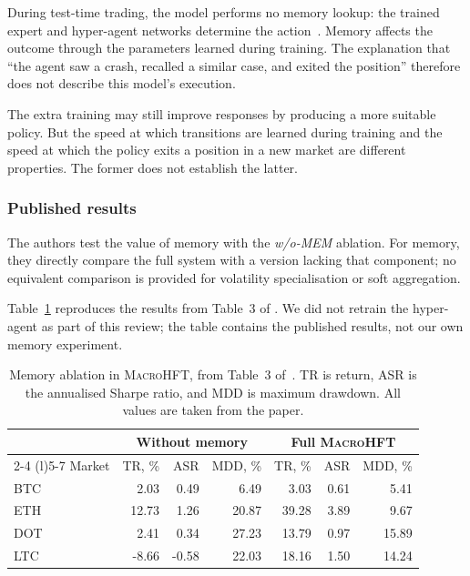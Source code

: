 \documentclass[9pt,a4paper,twocolumn]{extarticle}
\newcommand{\Macro}{\textsc{MacroHFT}}
\begin{document}
During test-time trading, the model performs no memory lookup: the trained expert and hyper-agent
networks determine the action~\cite{macrohftcode}. Memory affects the outcome through the
parameters learned during training. The explanation that ``the agent saw a crash, recalled a
similar case, and exited the position'' therefore does not describe this model's execution.

The extra training may still improve responses by producing a more suitable policy. But the
speed at which transitions are learned during training and the speed at which the policy exits a
position in a new market are different properties. The former does not establish the latter.

\subsubsection{Published results}

The authors test the value of memory with the \emph{w/o-MEM} ablation. For memory, they directly
compare the full system with a version lacking that component; no equivalent comparison is
provided for volatility specialisation or soft aggregation.

Table~\ref{tab:memory_ablation} reproduces the results from Table~3 of
\cite{zong2024macrohft}. We did not retrain the hyper-agent as part of this review; the table
contains the published results, not our own memory experiment.

\begin{table}[t]
  \centering
  \caption{Memory ablation in \Macro{}, from Table~3 of~\cite{zong2024macrohft}.
  TR is return, ASR is the annualised Sharpe ratio, and MDD is maximum drawdown.
  All values are taken from the paper.}
  \label{tab:memory_ablation}
  \footnotesize
  \renewcommand{\arraystretch}{1.15}
  \begin{tabular}{@{}lrrrrrr@{}}
    \toprule
    & \multicolumn{3}{c}{Without memory}
    & \multicolumn{3}{c}{Full \Macro{}}\\
    \cmidrule(lr){2-4}
    \cmidrule(l){5-7}
    Market
    & TR, \% & ASR & MDD, \%
    & TR, \% & ASR & MDD, \%\\
    \midrule
    BTC &  2.03 &  0.49 &  6.49
        &  3.03 &  0.61 &  5.41\\
    ETH & 12.73 &  1.26 & 20.87
        & 39.28 &  3.89 &  9.67\\
    DOT &  2.41 &  0.34 & 27.23
        & 13.79 &  0.97 & 15.89\\
    LTC & -8.66 & -0.58 & 22.03
        & 18.16 &  1.50 & 14.24\\
    \bottomrule
  \end{tabular}
\end{table}
\end{document}
